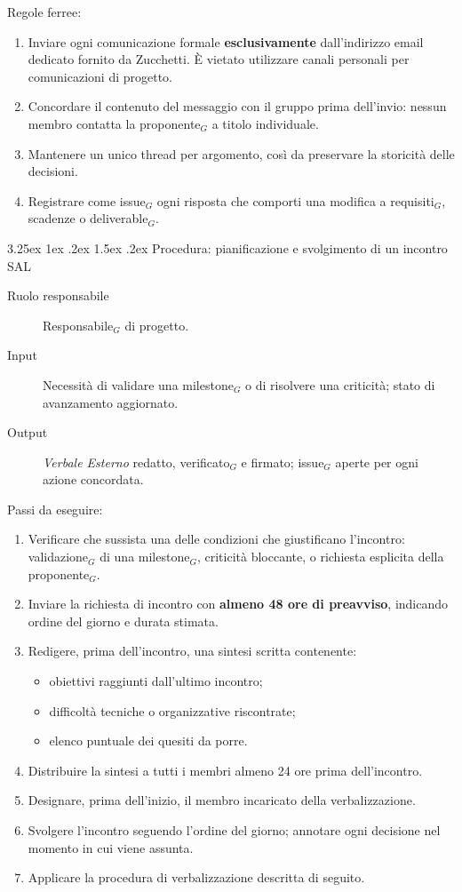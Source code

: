 \documentclass[a4paper, 10pt]{article}
\makeatletter
\renewcommand\paragraph{\@startsection{paragraph}{4}{\z@}%
  {3.25ex \@plus1ex \@minus .2ex}%
  {1.5ex \@plus .2ex}%
  {\normalfont\normalsize\bfseries}}
\makeatother
\begin{document}
\noindent Regole ferree:
\begin{enumerate}
    \item Inviare ogni comunicazione formale \textbf{esclusivamente} dall'indirizzo email dedicato fornito da Zucchetti. È vietato utilizzare canali personali per comunicazioni di progetto.
    \item Concordare il contenuto del messaggio con il gruppo prima dell'invio: nessun membro contatta la proponente$_G$ a titolo individuale.
    \item Mantenere un unico thread per argomento, così da preservare la storicità delle decisioni.
    \item Registrare come issue$_G$ ogni risposta che comporti una modifica a requisiti$_G$, scadenze o deliverable$_G$.
\end{enumerate}

\paragraph{Procedura: pianificazione e svolgimento di un incontro SAL}

\begin{description}
    \item[Ruolo responsabile] Responsabile$_G$ di progetto.
    \item[Input] Necessità di validare una milestone$_G$ o di risolvere una criticità; stato di avanzamento aggiornato.
    \item[Output] \textit{Verbale Esterno} redatto, verificato$_G$ e firmato; issue$_G$ aperte per ogni azione concordata.
\end{description}

\noindent Passi da eseguire:
\begin{enumerate}
    \item Verificare che sussista una delle condizioni che giustificano l'incontro: validazione$_G$ di una milestone$_G$, criticità bloccante, o richiesta esplicita della proponente$_G$.
    \item Inviare la richiesta di incontro con \textbf{almeno 48 ore di preavviso}, indicando ordine del giorno e durata stimata.
    \item Redigere, prima dell'incontro, una sintesi scritta contenente:
    \begin{itemize}
        \item obiettivi raggiunti dall'ultimo incontro;
        \item difficoltà tecniche o organizzative riscontrate;
        \item elenco puntuale dei quesiti da porre.
    \end{itemize}
    \item Distribuire la sintesi a tutti i membri almeno 24 ore prima dell'incontro.
    \item Designare, prima dell'inizio, il membro incaricato della verbalizzazione.
    \item Svolgere l'incontro seguendo l'ordine del giorno; annotare ogni decisione nel momento in cui viene assunta.
    \item Applicare la procedura di verbalizzazione descritta di seguito.
\end{enumerate}
\end{document}
